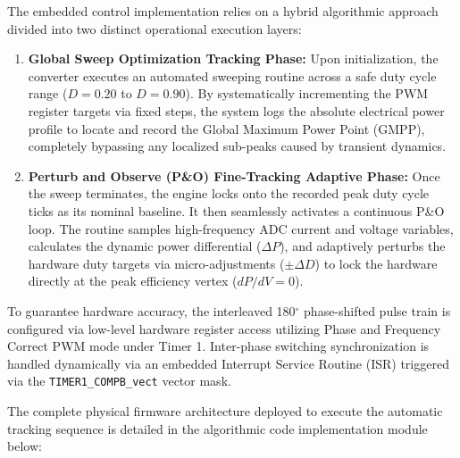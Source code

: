 The embedded control implementation relies on a hybrid algorithmic approach divided into two distinct operational execution layers:
\begin{enumerate}
    \item \textbf{Global Sweep Optimization Tracking Phase:} Upon initialization, the converter executes an automated sweeping routine across a safe duty cycle range ($D = 0.20$ to $D = 0.90$). By systematically incrementing the PWM register targets via fixed steps, the system logs the absolute electrical power profile to locate and record the Global Maximum Power Point (GMPP), completely bypassing any localized sub-peaks caused by transient dynamics.
    \item \textbf{Perturb and Observe (P\&O) Fine-Tracking Adaptive Phase:} Once the sweep terminates, the engine locks onto the recorded peak duty cycle ticks as its nominal baseline. It then seamlessly activates a continuous P\&O loop. The routine samples high-frequency ADC current and voltage variables, calculates the dynamic power differential ($\Delta P$), and adaptively perturbs the hardware duty targets via micro-adjustments ($\pm \Delta D$) to lock the hardware directly at the peak efficiency vertex ($dP/dV = 0$).
\end{enumerate}

To guarantee hardware accuracy, the interleaved 180$^\circ$ phase-shifted pulse train is configured via low-level hardware register access utilizing Phase and Frequency Correct PWM mode under Timer 1. Inter-phase switching synchronization is handled dynamically via an embedded Interrupt Service Routine (ISR) triggered via the \texttt{TIMER1\_COMPB\_vect} vector mask.

The complete physical firmware architecture deployed to execute the automatic tracking sequence is detailed in the algorithmic code implementation module below:

